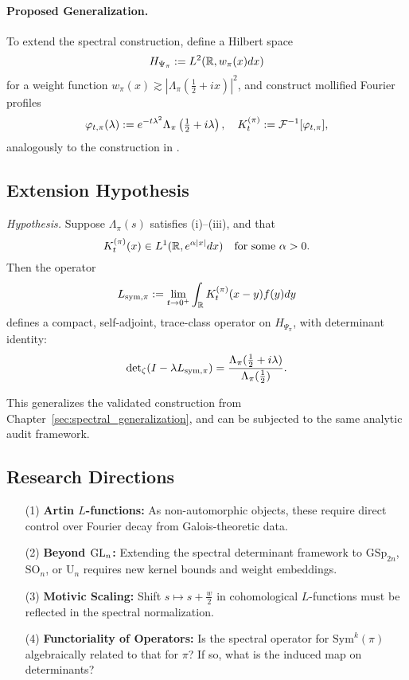 \paragraph{Proposed Generalization.}
To extend the spectral construction, define a Hilbert space
\[
H_{\Psi_\pi} := L^2(\mathbb{R}, w_\pi(x) dx)
\]
for a weight function \( w_\pi(x) \gtrsim |\Lambda_\pi(\tfrac{1}{2} + ix)|^2 \), and construct mollified Fourier profiles
\[
\varphi_{t,\pi}(\lambda) := e^{-t\lambda^2} \Lambda_\pi\left( \tfrac{1}{2} + i\lambda \right),
\quad
K_t^{(\pi)} := \mathcal{F}^{-1}[\varphi_{t,\pi}],
\]
analogously to the construction in .

\subsection*{Extension Hypothesis}

\textit{Hypothesis.} Suppose \( \Lambda_\pi(s) \) satisfies (i)--(iii), and that
\[
K_t^{(\pi)}(x) \in L^1(\mathbb{R}, e^{\alpha |x|} dx) \quad \text{for some } \alpha > 0.
\]
Then the operator
\[
L_{\mathrm{sym},\pi} := \lim_{t \to 0^+} \int_{\mathbb{R}} K_t^{(\pi)}(x - y) f(y) dy
\]
defines a compact, self-adjoint, trace-class operator on \( H_{\Psi_\pi} \), with determinant identity:
\[
\det\nolimits_{\zeta}(I - \lambda L_{\mathrm{sym},\pi}) = \frac{\Lambda_\pi(\tfrac{1}{2} + i\lambda)}{\Lambda_\pi(\tfrac{1}{2})}.
\]

This generalizes the validated construction from Chapter~\ref{sec:spectral_generalization}, and can be subjected to the same analytic audit framework.

\subsection*{Research Directions}

\begin{itemize}
  \item[(1)] \textbf{Artin \( L \)-functions:} As non-automorphic objects, these require direct control over Fourier decay from Galois-theoretic data.
  \item[(2)] \textbf{Beyond \( \mathrm{GL}_n \):} Extending the spectral determinant framework to \( \mathrm{GSp}_{2n} \), \( \mathrm{SO}_n \), or \( \mathrm{U}_n \) requires new kernel bounds and weight embeddings.
  \item[(3)] \textbf{Motivic Scaling:} Shift \( s \mapsto s + \tfrac{w}{2} \) in cohomological \( L \)-functions must be reflected in the spectral normalization.
  \item[(4)] \textbf{Functoriality of Operators:} Is the spectral operator for \( \mathrm{Sym}^k(\pi) \) algebraically related to that for \( \pi \)? If so, what is the induced map on determinants?
\end{itemize}


